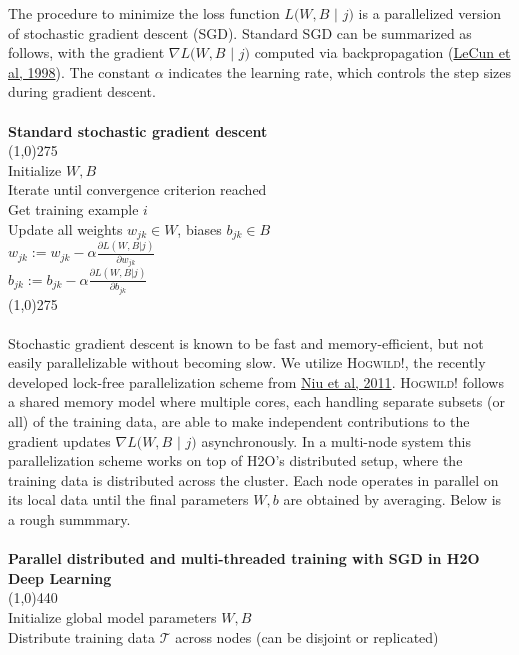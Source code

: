 \documentclass[11pt]{article}
\begin{document}
The procedure to minimize the loss function $L(W,B$ $|$ $j)$ is a parallelized version of stochastic gradient descent (SGD). Standard SGD can be summarized as follows, with the gradient $\nabla L(W,B$ $|$ $j)$ computed via backpropagation (\href{http://yann.lecun.com/exdb/publis/pdf/lecun-98b.pdf}{LeCun et al, 1998}). The constant $\alpha$ indicates the learning rate, which controls the step sizes during gradient descent.
\\
\\
{\bf{\footnotesize{Standard stochastic gradient descent}}}
\\
\line(1,0){275}
\\
Initialize $W,B$ 
\\
Iterate until convergence criterion reached
\\
\indent Get training example $i$
\\
\indent Update all weights $w_{jk} \in W$, biases $b_{jk} \in B$
\\
\indent \indent $w_{jk} := w_{jk} - \alpha \frac{\partial L(W,B | j)}{\partial w_{jk}}$
\\
\indent \indent $b_{jk} := b_{jk} - \alpha \frac{\partial L(W,B | j)}{\partial b_{jk}}$
\\
\line(1,0){275}
\\
\\
Stochastic gradient descent is known to be fast and memory-efficient, but not easily parallelizable without becoming slow. We utilize \textsc{Hogwild!}, the recently developed lock-free parallelization scheme from \href{http://i.stanford.edu/hazy/papers/hogwild-nips.pdf}{Niu et al, 2011}. \textsc{Hogwild!} follows a shared memory model where multiple cores, each handling separate subsets (or all) of the training data, are able to make independent contributions to the gradient updates $\nabla L(W,B$ $ |$ $j)$ asynchronously. In a multi-node system this parallelization scheme works on top of H2O's distributed setup, where the training data is distributed across the cluster. Each node operates in parallel on its local data until the final parameters $W,b$ are obtained by averaging. Below is a rough summmary.
\\
\\
\noindent
{\bf{\footnotesize{Parallel distributed and multi-threaded training with SGD in H2O Deep Learning}}}
\\
\line(1,0){440}
\\
Initialize global model parameters $W,B$
\\
Distribute training data $\mathcal{T}$ across nodes (can be disjoint or replicated)
\end{document}
